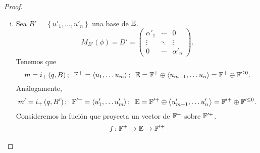 \begin{proof}
\begin{enumerate}[i)]
\[\begin{aligned}
\begin{array}{cccccc}
                         &  & \alpha _m &  &  & \\
                         &  &  & 0 &  &   \\
                         &  & \ &  & \ddots &  \\
                         &  &  &  &  & 0 
                    \end{array} \right) \left(
                    \begin{array}{c}
                         \vdots  \\
                         x_i  \\
                         \vdots \\
                    \end{array} \right) = \alpha _i x_i \neq 0 \implies u \notin \E^{\perp}.
                \end{aligned}
            \]
            Así pues, $\E ^{\perp} = \left< u_{m+1} , \dots , u_n \right> .$
        \item
            Sea $B'=\left\{u'_1, \dots , u'_n \right\}$ una base  de $\mathbb{E}$.
            \[
                M_{B'}\left( \phi \right) = D' =  \left(
                \begin{array}{ccc}
                    \alpha ' _1 & \cdots & 0 \\
                    \vdots & \ddots & \vdots \\
                    0 & \cdots & \alpha ' _n 
                \end{array} \right).
            \]
            Tenemos que 
            \[
                m=i_+\left( q, B \right); \hspace{0,2cm} \F^+=\left<u_1, \dots u_m \right>;
                \hspace{0,2cm} \E=\F^+ \oplus \left<u_{m+1}, \dots u_n \right>=\F^+ \oplus \F^{ {\leq 0}}.
            \]
            Análogamente,
            \[
                m^\prime=i_+\left( q, B^\prime \right); \hspace{0,2cm} \F^{\prime +}=
                \left<u^\prime_1, \dots u^\prime_m \right>; \hspace{0,2cm} \E=\F^{\prime +}
                \oplus \left<u^{\prime}_{m+1}, \dots u^\prime_n \right>=\F^{\prime+}
                \oplus \F ^{\prime\leq 0}.
            \]
            Consideremos la fución que proyecta un vector de $\mathbb{F}^+$ sobre $\mathbb{F}^{\prime+}$.
            \[
                \begin{aligned}
                    f \colon \F^+ &\to \E \to \F^{\prime+} \\

\end{aligned}\]
\end{enumerate}
\end{proof}
